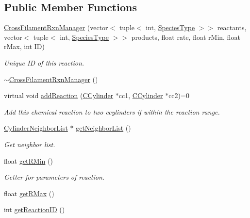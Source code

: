 \subsection*{Public Member Functions}
\begin{DoxyCompactItemize}
\item 
\hyperlink{classCrossFilamentRxnManager_a773d12131a70e970f6fee166f00bfb39}{Cross\+Filament\+Rxn\+Manager} (vector$<$ tuple$<$ int, \hyperlink{Species_8h_a50651af47c56ea0e27235468d23542cf}{Species\+Type} $>$$>$ reactants, vector$<$ tuple$<$ int, \hyperlink{Species_8h_a50651af47c56ea0e27235468d23542cf}{Species\+Type} $>$$>$ products, float rate, float r\+Min, float r\+Max, int I\+D)
\begin{DoxyCompactList}\small\item\em Unique I\+D of this reaction. \end{DoxyCompactList}\item 
\hyperlink{classCrossFilamentRxnManager_a3fff6c280b187f0c7641bec808ce6248}{$\sim$\+Cross\+Filament\+Rxn\+Manager} ()
\item 
virtual void \hyperlink{classCrossFilamentRxnManager_af43dae7fcbd4934577b5446034d65bfa}{add\+Reaction} (\hyperlink{classCCylinder}{C\+Cylinder} $\ast$cc1, \hyperlink{classCCylinder}{C\+Cylinder} $\ast$cc2)=0
\begin{DoxyCompactList}\small\item\em Add this chemical reaction to two ccylinders if within the reaction range. \end{DoxyCompactList}\item 
\hyperlink{classCylinderNeighborList}{Cylinder\+Neighbor\+List} $\ast$ \hyperlink{classCylinderNLContainer_afce343b3251cf0ed087cf5a62fb6aaee}{get\+Neighbor\+List} ()
\begin{DoxyCompactList}\small\item\em Get neighbor list. \end{DoxyCompactList}\end{DoxyCompactItemize}
{\bf }\par
\begin{DoxyCompactItemize}
\item 
float \hyperlink{classCrossFilamentRxnManager_aeb9207c18bb40c33d9c8fe99a006401d}{get\+R\+Min} ()
\begin{DoxyCompactList}\small\item\em Getter for parameters of reaction. \end{DoxyCompactList}\item 
float \hyperlink{classCrossFilamentRxnManager_a7fa04502185124176a72fb2f3965c698}{get\+R\+Max} ()
\item 
int \hyperlink{classCrossFilamentRxnManager_aa5527049ea757ea2b22fca486d3bf08d}{get\+Reaction\+I\+D} ()
\end{DoxyCompactItemize}

